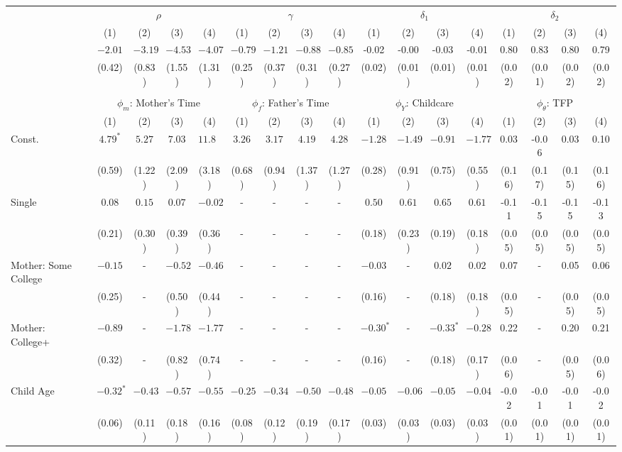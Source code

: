\begin{tabular}{lcccccccccccccccc}\\\toprule
 & \multicolumn{4}{c}{$\rho$} & \multicolumn{4}{c}{$\gamma$} & \multicolumn{4}{c}{$\delta_{1}$} & \multicolumn{4}{c}{$\delta_{2}$} \\
&(1)&(2)&(3)&(4)&(1)&(2)&(3)&(4)&(1)&(2)&(3)&(4)&(1)&(2)&(3)&(4)\\\cmidrule(r){2-5}\cmidrule(r){6-9}\cmidrule(r){10-13}\cmidrule(r){14-17}
&$-2.01$&$-3.19$&$-4.53$&$-4.07$&$-0.79$&$-1.21$&$-0.88$&$-0.85$&-0.02&-0.00&-0.03&-0.01&0.80&0.83&0.80&0.79\\
&(0.42)&(0.83)&(1.55)&(1.31)&(0.25)&(0.37)&(0.31)&(0.27)&(0.02)&(0.01)&(0.01)&(0.01)&(0.02)&(0.01)&(0.02)&(0.02)\\
&&&&&&&&&&&&&&&&\\
 & \multicolumn{4}{c}{$\phi_{m}$: Mother's Time} & \multicolumn{4}{c}{$\phi_{f}$: Father's Time} & \multicolumn{4}{c}{$\phi_{Y}$: Childcare} & \multicolumn{4}{c}{$\phi_{\theta}$: TFP} \\
&(1)&(2)&(3)&(4)&(1)&(2)&(3)&(4)&(1)&(2)&(3)&(4)&(1)&(2)&(3)&(4)\\\cmidrule(r){2-5}\cmidrule(r){6-9}\cmidrule(r){10-13}\cmidrule(r){14-17}
Const.&$4.79^{*}$&$5.27$&$7.03$&$11.82$&$3.26$&$3.17$&$4.19$&$4.28$&$-1.28$&$-1.49$&$-0.91$&$-1.77$&0.03&-0.06&0.03&0.10\\
&(0.59)&(1.22)&(2.09)&(3.18)&(0.68)&(0.94)&(1.37)&(1.27)&(0.28)&(0.91)&(0.75)&(0.55)&(0.16)&(0.17)&(0.15)&(0.16)\\
Single&$0.08$&$0.15$&$0.07$&$-0.02$&-&-&-&-&$0.50$&$0.61$&$0.65$&$0.61$&-0.11&-0.15&-0.15&-0.13\\
&(0.21)&(0.30)&(0.39)&(0.36)&-&-&-&-&(0.18)&(0.23)&(0.19)&(0.18)&(0.05)&(0.05)&(0.05)&(0.05)\\
Mother: Some College&$-0.15$&-&$-0.52$&$-0.46$&-&-&-&-&$-0.03$&-&$0.02$&$0.02$&0.07&-&0.05&0.06\\
&(0.25)&-&(0.50)&(0.44)&-&-&-&-&(0.16)&-&(0.18)&(0.18)&(0.05)&-&(0.05)&(0.05)\\
Mother: College+&$-0.89$&-&$-1.78$&$-1.77$&-&-&-&-&$-0.30^{*}$&-&$-0.33^{*}$&$-0.28$&0.22&-&0.20&0.21\\
&(0.32)&-&(0.82)&(0.74)&-&-&-&-&(0.16)&-&(0.18)&(0.17)&(0.06)&-&(0.05)&(0.06)\\
Child Age&$-0.32^{*}$&$-0.43$&$-0.57$&$-0.55$&$-0.25$&$-0.34$&$-0.50$&$-0.48$&$-0.05$&$-0.06$&$-0.05$&$-0.04$&-0.02&-0.01&-0.01&-0.02\\
&(0.06)&(0.11)&(0.18)&(0.16)&(0.08)&(0.12)&(0.19)&(0.17)&(0.03)&(0.03)&(0.03)&(0.03)&(0.01)&(0.01)&(0.01)&(0.01)\\

\end{tabular}
